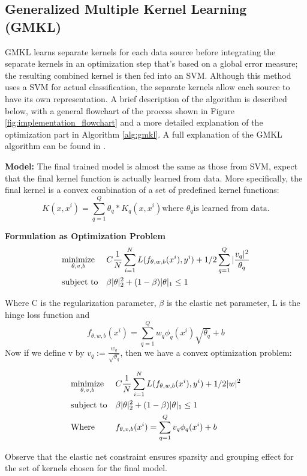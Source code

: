 \documentclass{article}
\begin{document}
\subsection*{Generalized Multiple Kernel Learning (GMKL)}
GMKL learns separate kernels for each data source before integrating the
separate kernels in an optimization step that's based on a global error
measure; the resulting combined kernel is then fed into an SVM. Although this
method uses a SVM for actual classification, the separate kernels allow each
source to have its own representation. A brief description of the algorithm is
described below, with a general flowchart of the process shown in Figure
\ref{fig:implementation_flowchart} and a more detailed explanation of the
optimization part in Algorithm \ref{alg:gmkl}. A full explanation of the GMKL
algorithm can be found in \cite{gmkl}.

\textbf{Model:}
The final trained model is almost the same as those from SVM, expect that the final kernel function is actually learned from data. More specifically, the final kernel is a convex combination of a set of predefined kernel functions: $$K(x, x^i) = \sum_{q=1}^{Q} \theta_q * K_q(x, x^i) \text{where }\theta_q \text{is learned from data}.$$

\textbf{Formulation as Optimization Problem}
\begin{align*}
&\text{$\underset{\theta, v, b}{\text{minimize}}$} & &C  \frac{1}{N} \sum_{i=1}^{N} L(f_{\theta, w, b}(x^i), y^i) + 1/2 \sum_{q=1}^{Q}|\frac{v_q|^2}{\theta_q} \\
&\text{subject to} & &\beta|\theta|_2^2 + (1-\beta){|\theta|_1} \leq 1
\end{align*}


Where C is the regularization parameter, $\beta$ is the elastic net parameter, L is the hinge loss function and $$f_{\theta, w, b}(x^i) = \sum_{q=1}^{Q} w_q \phi_q(x^i) \sqrt{\theta_q} + b $$
Now if we define v by $v_q := \frac{w_q}{\sqrt{\theta_q}}$, then we have a convex optimization problem:

\begin{align*}
&\text{$\underset{\theta, v, b}{\text{minimize}}$} & &C  \frac{1}{N} \sum_{i=1}^{N} L(f_{\theta, w, b}(x^i), y^i) + 1/2 |w|^2 \\
&\text{subject to} & &\beta|\theta|_2^2 + (1-\beta){|\theta|_1} \leq 1 \\
&\text{Where}  & &f_{\theta, v, b}(x^i) = \sum_{q=1}^{Q} v_q \phi_q(x^i)  + b
\end{align*}

Observe that the elastic net constraint ensures sparsity and grouping effect for the set of kernels chosen for the final model.
\end{document}
